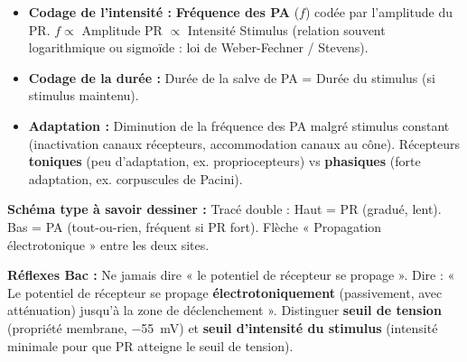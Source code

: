 \documentclass[11pt]{article}
\begin{document}
\begin{methode}
\begin{enumerate}
\begin{itemize}
        \item \textbf{Codage de l'intensité :} \textbf{Fréquence des PA} ($f$) codée par l'amplitude du PR. $f \propto$ Amplitude PR $\propto$ Intensité Stimulus (relation souvent logarithmique ou sigmoïde : loi de Weber-Fechner / Stevens).
        \item \textbf{Codage de la durée :} Durée de la salve de PA = Durée du stimulus (si stimulus maintenu).
        \item \textbf{Adaptation :} Diminution de la fréquence des PA malgré stimulus constant (inactivation canaux récepteurs, accommodation canaux  au cône). Récepteurs \textbf{toniques} (peu d'adaptation, ex. propriocepteurs) vs \textbf{phasiques} (forte adaptation, ex. corpuscules de Pacini).
    \end{itemize}
\end{enumerate}

\textbf{Schéma type à savoir dessiner :} Tracé double : Haut = PR (gradué, lent). Bas = PA (tout-ou-rien, fréquent si PR fort). Flèche « Propagation électrotonique » entre les deux sites.

\textbf{Réflexes Bac :} Ne jamais dire « le potentiel de récepteur se propage ». Dire : « Le potentiel de récepteur se propage \textbf{électrotoniquement} (passivement, avec atténuation) jusqu'à la zone de déclenchement ». Distinguer \textbf{seuil de tension} (propriété membrane, \SI{-55}{mV}) et \textbf{seuil d'intensité du stimulus} (intensité minimale pour que PR atteigne le seuil de tension).
\end{methode}
\end{document}
